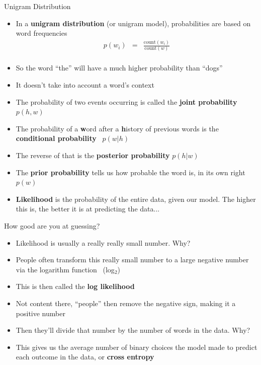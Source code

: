 \documentclass{beamer}
\newcommand{\detail}[1]{{\color{lightgrey}\small{}#1}}
\begin{document}
\begin{frame}{Unigram Distribution}
\begin{itemize}
	\item In a \textbf{unigram distribution} (or unigram model), probabilities are based on word frequencies
	\pause
	\begin{eqnarray*}
	 p(w_i) & = & \frac{\text{count}(w_i)}{\text{count}(w)} \\
	\end{eqnarray*}
	\vspace*{-2.0em}
	\pause
	\item So the word ``the'' will have a much higher probability than ``dogs''
	\pause
	\item It doesn't take into account a word's context
\end{itemize}
\end{frame}


\begin{frame}{}
\begin{itemize}
	\item The probability of two events occurring is called the \textbf{joint probability} \ \detail{$p(h,w)$}
	\pause
	\item The probability of a \textbf{w}ord after a \textbf{h}istory of previous words is the \textbf{conditional probability} \ \detail{$p(w|h)$}
	\pause
	\item The reverse of that is the \textbf{posterior probability} \detail{$p(h|w)$}
	\pause
	\item The \textbf{prior probability} tells us how probable the word is, in its own right \ \detail{$p(w)$}
	\pause
	\item \textbf{Likelihood} is the probability of the entire data, given our model.  \pause The higher this is, the better it is at predicting the data...
\end{itemize}
\end{frame}

\begin{frame}{How good are you at guessing?}
\begin{itemize}
	\item Likelihood is usually a really really small number.  Why?
	\pause
	\item People often transform this really small number to a large negative number via the logarithm function \ \detail{(log$_2$)}
	\item This is then called the \textbf{log likelihood}
	\pause
	\item Not content there, ``people'' then remove the negative sign, making it a positive number
	\item Then they'll divide that number by the number of words in the data.  Why?
	\pause
	\item This gives us the average number of binary choices the model made to predict each outcome in the data, or \textbf{cross entropy}
\end{itemize}
\end{frame}
\end{document}
